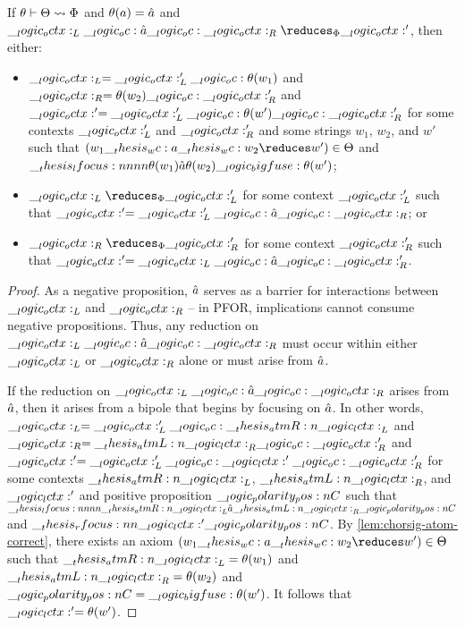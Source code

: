 \begin{theorem}\label{thm:formula-as-process:choreograph-soundness}
  If $\theta \vdash \Theta \rightsquigarrow \Phi$ and $\theta(a) = \hat{a}$ and $\octx_L \oc \defp{a} \oc \octx_R \reduces_{\orsig} \octx'$, then either:
  \begin{itemize}
  \item $\__logic_octx:_L = \__logic_octx:'_L \__logic_oc: \theta(w_1)$ and $\__logic_octx:_R = \theta(w_2) \__logic_oc: \__logic_octx:'_R$ and $\__logic_octx:' = \__logic_octx:'_L \__logic_oc: \theta(w') \__logic_oc: \__logic_octx:'_R$ for some contexts $\__logic_octx:'_L$ and $\__logic_octx:'_R$ and some strings $w_1$, $w_2$, and $w'$ such that $(w_1 \wc a \wc w_2 \reduces w') \in \srsig$ and $\__thesis_lfocus:nnnn {\theta(w_1)} {\hat{a}} {\theta(w_2)} {\__logic_bigfuse: \theta(w')}$;
  \item $\octx_L \reduces_{\orsig} \octx'_L$ for some context $\__logic_octx:'_L$ such that $\__logic_octx:' = \__logic_octx:'_L \__logic_oc: \hat{a} \__logic_oc: \__logic_octx:_R$; or
  \item $\octx_R \reduces_{\orsig} \octx'_R$ for some context $\__logic_octx:'_R$ such that $\__logic_octx:' = \__logic_octx:_L \__logic_oc: \hat{a} \__logic_oc: \__logic_octx:'_R$.
  \end{itemize}
\end{theorem}
\begin{proof}
  As a negative proposition, $\hat{a}$ serves as a barrier for interactions between $\__logic_octx:_L$ and $\__logic_octx:_R$ -- in \ac{PFOR}, implications cannot consume negative propositions.
  Thus, any reduction on $\__logic_octx:_L \__logic_oc: \hat{a} \__logic_oc: \__logic_octx:_R$ must occur within either $\__logic_octx:_L$ or $\__logic_octx:_R$ alone or must arise from $\hat{a}$.

  If the reduction on $\__logic_octx:_L \__logic_oc: \hat{a} \__logic_oc: \__logic_octx:_R$ arises from $\hat{a}$, then it arises from a bipole that begins by focusing on $\hat{a}$.
  In other words, $\__logic_octx:_L = \__logic_octx:'_L \__logic_oc: \__thesis_atmR:n {\__logic_lctx:}_L$ and $\__logic_octx:_R = \__thesis_atmL:n {\__logic_lctx:}_R \__logic_oc: \__logic_octx:'_R$ and $\__logic_octx:' = \__logic_octx:'_L \__logic_oc: \__logic_lctx:' \__logic_oc: \__logic_octx:'_R$ for some contexts $\__thesis_atmR:n {\__logic_lctx:}_L$, $\__thesis_atmL:n {\__logic_lctx:}_R$, and $\__logic_lctx:'$ and positive proposition $\__logic_polarity_pos:n {C}$ such that $\__thesis_lfocus:nnnn {\__thesis_atmR:n {\__logic_lctx:}_L} {\hat{a}} {\__thesis_atmL:n {\__logic_lctx:}_R} {\__logic_polarity_pos:n {C}}$ and $\__thesis_rfocus:nn {\__logic_lctx:'} {\__logic_polarity_pos:n {C}}$.
  By \cref{lem:chorsig-atom-correct}, there exists an axiom $(w_1 \wc a \wc w_2 \reduces w') \in \srsig$ such that $\__thesis_atmR:n {\__logic_lctx:}_L = \theta(w_1)$ and $\__thesis_atmL:n {\__logic_lctx:}_R = \theta(w_2)$ and $\__logic_polarity_pos:n {C} = \__logic_bigfuse: \theta(w')$.
  It follows that $\__logic_lctx:' = \theta(w')$.
\end{proof}


